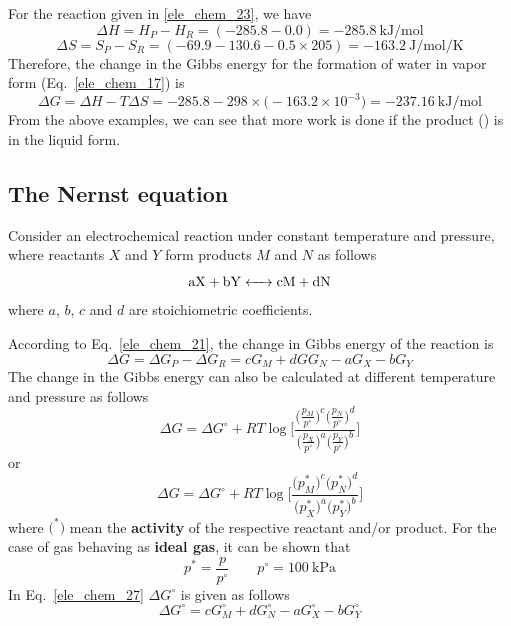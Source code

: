 \documentclass[12pt,a4paper]{scrartcl}
\begin{document}
\begin{onehalfspace}
\begin{equation*}
\end{equation*}
For the reaction given in \ref{ele_chem_23}, we have
\begin{equation*}
	\Delta H = H_P-H_R = (-285.8-0.0)=\SI{-285.8}{\kilo\joule\per\mole}
\end{equation*}
\begin{equation*}
	\Delta S = S_P-S_R = (-69.9-130.6-0.5\times205)=\SI{-163.2}{\joule\per\mole\per\kelvin}
\end{equation*}
Therefore, the change in the Gibbs energy for the formation of water in vapor form (Eq.~\eqref{ele_chem_17}) is
\begin{equation*}
	\Delta G = \Delta H -T\Delta S = -285.8-298\times\Big(-163.2\times10^{-3}\Big)=\SI{-237.16}{\kilo\joule\per\mole}
\end{equation*}
From the above examples, we can see that more work is done if the product () is in the liquid form.

\subsection{The Nernst equation}
Consider an electrochemical reaction under constant temperature and pressure, where reactants $X$ and $Y$ form products $M$ and $N$ as follows
\begin{equation}\label{ele_chem_24}
	\ce{aX + bY <-> cM + dN}
\end{equation}
where $a$, $b$, $c$ and $d$ are stoichiometric coefficients.

According to Eq.~\eqref{ele_chem_21}, the change in Gibbs energy of the reaction is 
\begin{equation}\label{ele_chem_25}
	\Delta G = \Delta G_P - \Delta G_R= cG_M+dGG_N-aG_X-bG_Y
\end{equation}
The change in the Gibbs energy can also be calculated at different temperature and pressure as follows
\begin{equation}\label{ele_chem_26}
	\Delta G = \Delta G^\circ + RT\log{\Bigg[\frac{\Big(\frac{p_M}{p^\circ}\Big)^c\Big(\frac{p_N}{p^\circ}\Big)^d}{\Big(\frac{p_X}{p^\circ}\Big)^a\Big(\frac{p_Y}{p^\circ}\Big)^b}\Bigg]}
\end{equation}
or 
\begin{equation}\label{ele_chem_27}
	\Delta G = \Delta G^\circ + RT\log{\Bigg[\frac{\Big({p_M^*}\Big)^c\Big({p_N^*}\Big)^d}{\Big({p_X^*}\Big)^a\Big({p_Y^*}\Big)^b}\Bigg]}
\end{equation}
where $\Big(^*\Big)$ mean the \textbf{activity} of the respective reactant and/or product. For the case of gas behaving as \textbf{ideal gas}, it can be shown that 
\begin{equation}\label{ele_chem_28}
	p^*=\frac{p}{p^\circ}\qquad p^\circ=\SI{100}{\kilo\pascal}
\end{equation}
In Eq.~\eqref{ele_chem_27} $\Delta G^\circ$ is given as follows
\begin{equation}\label{ele_chem_29}
	\Delta G^\circ = cG_M^\circ+dG_N^\circ-aG_X^\circ-bG_Y^\circ
\end{equation}


\end{onehalfspace}
\end{document}
